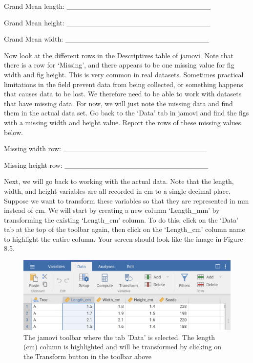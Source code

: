 \documentclass[
  openany]{scrbook}
\begin{document}
Grand Mean length: \_\_\_\_\_\_\_\_\_\_\_\_\_\_\_\_\_\_\_\_\_\_\_\_\_\_\_\_

Grand Mean height: \_\_\_\_\_\_\_\_\_\_\_\_\_\_\_\_\_\_\_\_\_\_\_\_\_\_\_\_

Grand Mean width: \_\_\_\_\_\_\_\_\_\_\_\_\_\_\_\_\_\_\_\_\_\_\_\_\_\_\_\_

Now look at the different rows in the Descriptives table of jamovi.
Note that there is a row for `Missing', and there appears to be one missing value for fig width and fig height.
This is very common in real datasets.
Sometimes practical limitations in the field prevent data from being collected, or something happens that causes data to be lost.
We therefore need to be able to work with datasets that have missing data.
For now, we will just note the missing data and find them in the actual data set.
Go back to the `Data' tab in jamovi and find the figs with a missing width and height value.
Report the rows of these missing values below.

Missing width row: \_\_\_\_\_\_\_\_\_\_\_\_\_\_\_\_\_\_\_\_\_\_\_\_\_\_\_\_

Missing height row: \_\_\_\_\_\_\_\_\_\_\_\_\_\_\_\_\_\_\_\_\_\_\_\_\_\_\_\_

Next, we will go back to working with the actual data.
Note that the length, width, and height variables are all recorded in cm to a single decimal place.
Suppose we want to transform these variables so that they are represented in mm instead of cm.
We will start by creating a new column `Length\_mm' by transforming the existing `Length\_cm' column.
To do this, click on the `Data' tab at the top of the toolbar again, then click on the `Length\_cm' column name to highlight the entire column.
Your screen should look like the image in Figure 8.5.

\begin{figure}
\includegraphics[width=1\linewidth]{img/jamovi_transform_fig_length} \caption{The jamovi toolbar where the tab 'Data' is selected. The length (cm) column is highlighted and will be transformed by clicking on the Transform button in the toolbar above}\label{fig:unnamed-chunk-29}
\end{figure}
\end{document}
